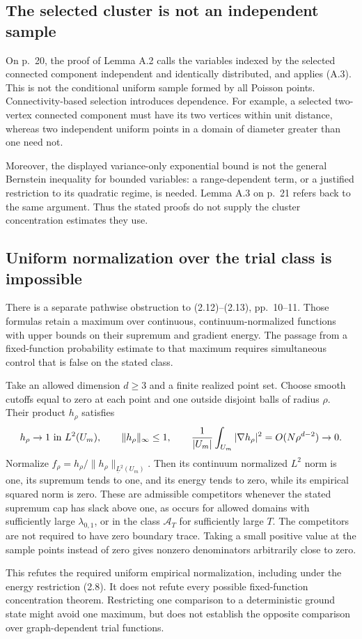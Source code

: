 \documentclass[10pt]{article}
\begin{document}
\subsection*{The selected cluster is not an independent sample}
On p. 20, the proof of Lemma A.2 calls the variables indexed by the selected connected component independent and identically distributed, and applies (A.3). This is not the conditional uniform sample formed by all Poisson points. Connectivity-based selection introduces dependence. For example, a selected two-vertex connected component must have its two vertices within unit distance, whereas two independent uniform points in a domain of diameter greater than one need not.\par
Moreover, the displayed variance-only exponential bound is not the general Bernstein inequality for bounded variables: a range-dependent term, or a justified restriction to its quadratic regime, is needed. Lemma A.3 on p. 21 refers back to the same argument. Thus the stated proofs do not supply the cluster concentration estimates they use.\par
\subsection*{Uniform normalization over the trial class is impossible}
There is a separate pathwise obstruction to (2.12)–(2.13), pp. 10–11. Those formulas retain a maximum over continuous, continuum-normalized functions with upper bounds on their supremum and gradient energy. The passage from a fixed-function probability estimate to that maximum requires simultaneous control that is false on the stated class.\par
Take an allowed dimension \(d\geq3\) and a finite realized point set. Choose smooth cutoffs equal to zero at each point and one outside disjoint balls of radius \(\rho\). Their product \(h_\rho\) satisfies \[h_\rho\to1\ \hbox{in }L^2(U_m),\qquad
 \|h_\rho\|_\infty\leq1,\qquad
 \frac{1}{|U_m|}\int_{U_m}|\nabla h_\rho|^2=O(N\rho^{d-2})\to0.\] Normalize \(f_\rho=h_\rho/\|h_\rho\|_{\underline L^2(U_m)}\). Then its continuum normalized \(L^2\) norm is one, its supremum tends to one, and its energy tends to zero, while its empirical squared norm is zero. These are admissible competitors whenever the stated supremum cap has slack above one, as occurs for allowed domains with sufficiently large \(\lambda_{0,1}\), or in the class \(\mathcal A_T\) for sufficiently large \(T\). The competitors are not required to have zero boundary trace. Taking a small positive value at the sample points instead of zero gives nonzero denominators arbitrarily close to zero.\par
This refutes the required uniform empirical normalization, including under the energy restriction (2.8). It does not refute every possible fixed-function concentration theorem. Restricting one comparison to a deterministic ground state might avoid one maximum, but does not establish the opposite comparison over graph-dependent trial functions.\par
\end{document}
